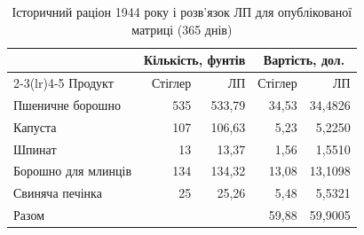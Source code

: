 \begin{table}[htbp]
\centering\small
\caption{Історичний раціон 1944 року і розв’язок ЛП для опублікованої матриці (365 днів)}
\label{tab:glpk-historic-1944}
\begin{tabular}{lrrrr}
\toprule
 & \multicolumn{2}{c}{Кількість, фунтів} & \multicolumn{2}{c}{Вартість, дол.} \\
\cmidrule(lr){2-3}\cmidrule(lr){4-5}
Продукт & Стіглер & ЛП & Стіглер & ЛП \\
\midrule
Пшеничне борошно & 535 & 533{,}79 & 34{,}53 & 34{,}4826 \\
Капуста & 107 & 106{,}63 & 5{,}23 & 5{,}2250 \\
Шпинат & 13 & 13{,}37 & 1{,}56 & 1{,}5510 \\
Борошно для млинців & 134 & 134{,}32 & 13{,}08 & 13{,}1098 \\
Свиняча печінка & 25 & 25{,}26 & 5{,}48 & 5{,}5321 \\
\midrule
Разом & & & 59{,}88 & 59{,}9005 \\
\bottomrule
\end{tabular}
\end{table}
